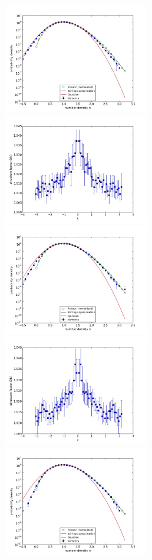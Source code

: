 \documentclass{article}
\begin{document}
\begin{figure}
\begin{center}
\end{center}
\includegraphics[width=0.5\linewidth,height=1.9in]{fig1/react_dt1_hist_mid1.jpg}
\includegraphics[width=0.5\linewidth,height=1.9in]{fig1/react_dt1_Sk_mid1.jpg}
\includegraphics[width=0.5\linewidth,height=1.9in]{fig1/react_dt1_hist_mid2.jpg}
\includegraphics[width=0.5\linewidth,height=1.9in]{fig1/react_dt1_Sk_mid2.jpg}
\includegraphics[width=0.5\linewidth,height=1.9in]{fig1/react_dt1_hist_mid3.jpg}

\end{figure}
\end{document}
